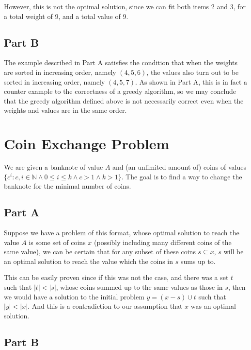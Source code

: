 \documentclass{article}
\begin{document}
However, this is not the optimal solution, since we can fit both items 2 and 3, for a total weight of 9, and a total value of 9.

\subsection*{Part B}

The example described in Part A satisfies the condition that when the weights are sorted in increasing order, namely \((4,5,6)\), the values also turn out to be sorted in increasing order, namely \((4,5,7)\). As shown in Part A, this is in fact a counter example to the correctness of a greedy algorithm, so we may conclude that the greedy algorithm defined above is not necessarily correct even when the weights and values are in the same order.

\section{Coin Exchange Problem}

We are given a banknote of value \(A\) and (an unlimited amount of) coins of values \(\{c^i : c, i \in \mathbb{N} \land 0 \leq i \leq k \land c > 1 \land k > 1\}\). The goal is to find a way to change the banknote for the minimal number of coins.

\subsection*{Part A}

Suppose we have a problem of this format, whose optimal solution to reach the value \(A\) is some set of coins \(x\) (possibly including many different coins of the same value), we can be certain that for any subset of these coins \(s \subseteq x\), \(s\) will be an optimal solution to reach the value which the coins in \(s\) sums up to.

This can be easily proven since if this was not the case, and there was a set \(t\) such that \(|t| < |s|\), whose coins summed up to the same values as those in \(s\), then we would have a solution to the initial problem \(y = (x - s) \cup t\) such that \(|y| < |x|\). And this is a contradiction to our assumption that \(x\) was an optimal solution.

\subsection*{Part B}
\end{document}
